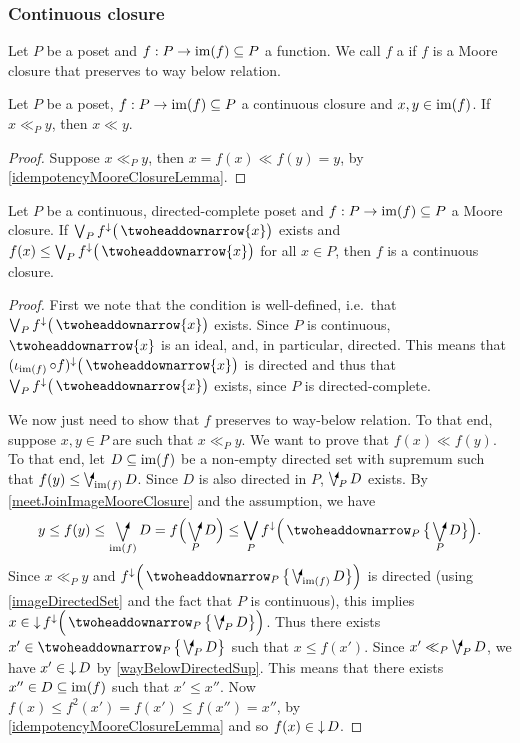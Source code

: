 \subsubsection{Continuous closure}
\begin{definition}
Let $P$ be a poset and $f: P\to \operatorname{im}(f) \subseteq P$ a function. We call $f$ a  if $f$ is a Moore closure that preserves to way below relation.
\end{definition}

\begin{lemma}
Let $P$ be a poset, $f: P\to \operatorname{im}(f) \subseteq P$ a continuous closure and $x,y\in \operatorname{im}(f)$. If $x \ll_P y$, then $x \ll y$.
\end{lemma}
\begin{proof}
Suppose $x\ll_P y$, then $x = f(x) \ll f(y) = y$, by \ref{idempotencyMooreClosureLemma}.
\end{proof}

\begin{proposition} \label{continuousClosureCriterion}
Let $P$ be a continuous, directed-complete poset and $f: P\to \operatorname{im}(f) \subseteq P$ a Moore closure. If $\bigvee_{P} f^\imf\big(\ddownset\{x\}\big)$ exists and $f(x) \leq \bigvee_{P} f^\imf\big(\ddownset\{x\}\big)$ for all $x\in P$, then $f$ is a continuous closure.
\end{proposition}
\begin{proof}
First we note that the condition is well-defined, i.e.\ that $\bigvee_{P} f^\imf\big(\ddownset\{x\}\big)$ exists. Since $P$ is continuous, $\ddownset\{x\}$ is an ideal, and, in particular, directed. This means that $(\incl_{\im(f)}\circ f)^\imf\big(\ddownset\{x\}\big)$ is directed and thus that $\bigvee_{P} f^\imf\big(\ddownset\{x\}\big)$ exists, since $P$ is directed-complete.

We now just need to show that $f$ preserves to way-below relation. To that end, suppose $x,y\in P$ are such that $x\ll_P y$. We want to prove that $f(x) \ll f(y)$. To that end, let $D\subseteq \operatorname{im}(f)$ be a non-empty directed set with supremum such that $f(y) \leq \dirvee_{\im(f)}D$. Since $D$ is also directed in $P$, $\dirvee_P D$ exists. By \ref{meetJoinImageMooreClosure} and the assumption, we have
\[ y \leq f(y) \leq \dirvee_{\im(f)}D = f\Big(\dirvee_{P}D\Big) \leq \bigvee_P f^\imf\Big(\ddownset_P\big\{\dirvee_{P} D\big\}\Big). \]
Since $x\ll_P y$ and $f^\imf\Big(\ddownset_P\big\{\dirvee_{\im(f)} D\big\}\Big)$ is directed (using \ref{imageDirectedSet} and the fact that $P$ is continuous), this implies $x\in \downset f^\imf\Big(\ddownset_P\big\{\dirvee_{P} D\big\}\Big)$. Thus there exists $x'\in \ddownset_P\big\{\dirvee_{P} D\big\}$ such that $x\leq f(x')$. Since $x'\ll_P \dirvee_{P} D$, we have $x'\in \operatorname{\downarrow} D$ by \ref{wayBelowDirectedSup}. This means that there exists $x''\in D\subseteq \operatorname{im}(f)$ such that $x'\leq x''$. Now $f(x) \leq f^2(x') = f(x') \leq f(x'') = x''$, by \ref{idempotencyMooreClosureLemma} and so $f(x) \in \operatorname{\downarrow} D$.
\end{proof}

